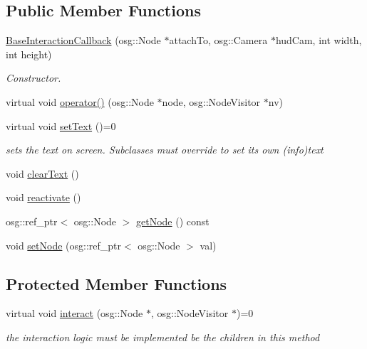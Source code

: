 \subsection*{Public Member Functions}
\begin{DoxyCompactItemize}
\item 
\hyperlink{classbrtr_1_1_base_interaction_callback_afc863306967933e0ebef5f7322fab06e}{Base\+Interaction\+Callback} (osg\+::\+Node $\ast$attach\+To, osg\+::\+Camera $\ast$hud\+Cam, int width, int height)
\begin{DoxyCompactList}\small\item\em Constructor. \end{DoxyCompactList}\item 
virtual void \hyperlink{classbrtr_1_1_base_interaction_callback_ab2cf0f22fcc9e79ecda29a547edb5084}{operator()} (osg\+::\+Node $\ast$node, osg\+::\+Node\+Visitor $\ast$nv)
\item 
virtual void \hyperlink{classbrtr_1_1_base_interaction_callback_a0fe57e329f044e21d49041c861435ad8}{set\+Text} ()=0
\begin{DoxyCompactList}\small\item\em sets the text on screen. Subclasses must override to set its own (info)text \end{DoxyCompactList}\item 
void \hyperlink{classbrtr_1_1_base_interaction_callback_ad74fe9ac5d86c7f23d18614d5abb1003}{clear\+Text} ()
\item 
void \hyperlink{classbrtr_1_1_base_interaction_callback_a95ede7c8aa0dc1e067ae64615ecb23db}{reactivate} ()
\item 
osg\+::ref\+\_\+ptr$<$ osg\+::\+Node $>$ \hyperlink{classbrtr_1_1_base_interaction_callback_aafca24ccde1cf21f4132f65a83e0b2bc}{get\+Node} () const 
\item 
void \hyperlink{classbrtr_1_1_base_interaction_callback_a420a1977c954850dbe66a189908cde80}{set\+Node} (osg\+::ref\+\_\+ptr$<$ osg\+::\+Node $>$ val)
\end{DoxyCompactItemize}
\subsection*{Protected Member Functions}
\begin{DoxyCompactItemize}
\item 
virtual void \hyperlink{classbrtr_1_1_base_interaction_callback_a3ed50c9c1725f932e0b78c90ba24e1ed}{interact} (osg\+::\+Node $\ast$, osg\+::\+Node\+Visitor $\ast$)=0
\begin{DoxyCompactList}\small\item\em the interaction logic must be implemented be the children in this method \end{DoxyCompactList}\end{DoxyCompactItemize}
